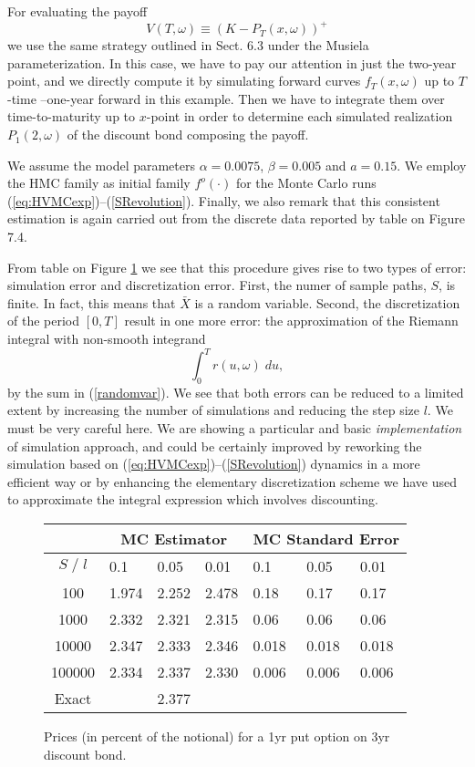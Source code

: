 For evaluating the payoff 
$$
V (T, \omega) \equiv (K - P_T(x, \omega))^+
$$
we use the same strategy outlined in Sect. 6.3 under the Musiela
parameterization. In this case, we have to pay our attention in just
the two-year point, and we directly compute it by simulating forward
curves $f_T(x,\omega)$ up to $T$-time --one-year forward in this
example. Then we have to integrate them over time-to-maturity up to
$x$-point in order to determine each simulated realization $P_1(2,
\omega)$ of the discount bond composing the payoff.  

We assume the model parameters $\alpha = 0.0075$, $\beta = 0.005$ and
$a = 0.15$. We employ the HMC family as initial family $f^o(\cdot)$
for the Monte Carlo runs
(\ref{eq:HVMCexp})--(\ref{SRevolution}). Finally, we also remark that
this consistent estimation is again carried out from the discrete data
reported by table on Figure 7.4. 

From table on Figure \ref{MCPut} we see that this procedure gives rise
to two types of error: simulation error and discretization
error. First, the numer of sample paths, $S$, is finite. In fact, this means
that $\bar{X}$ is a random variable. Second, the discretization of the
period $[0, T]$ result in one more error: the approximation of the
Riemann integral with non-smooth integrand 
$$
\int_0^T r(u,\omega) \; du,
$$
by the sum in (\ref{randomvar}). We see that both errors can be
reduced to a limited extent by increasing the number of simulations
and reducing the step size $l$. We must be very careful here. We are
showing a particular and basic {\sl implementation} of simulation
approach, and could be certainly improved by reworking the simulation
based on (\ref{eq:HVMCexp})--(\ref{SRevolution}) dynamics in a more
efficient way or by enhancing the elementary discretization scheme we
have used to approximate the integral expression which involves
discounting. 
\begin{figure}[h!]
\caption{Prices (in percent of the notional) for a 1yr put option on
  3yr discount bond.\label{MCPut}} 
\begin{center}
\begin{tabular}{|c|lll|lll|}
\hline\hline
& \multicolumn{3}{|c|}{MC Estimator} &
\multicolumn{3}{|c|}{MC Standard Error} \\
\hline
$S\; /\; l$ & 0.1 & 0.05 & 0.01 & 0.1 & 0.05 & 0.01 \\
\hline 
  100 & 1.974&    2.252&    2.478&    0.18&    0.17&    0.17\\
 1000 & 2.332&    2.321&    2.315&    0.06&    0.06&    0.06\\
10000 & 2.347&    2.333&    2.346&    0.018&   0.018&  0.018\\
100000& 2.334&    2.337&    2.330&    0.006&   0.006&  0.006\\
\hline
Exact & \multicolumn{3}{|c|}{2.377} & \multicolumn{3}{|c|}{} \\
\hline 
\end{tabular}
\end{center}
\end{figure}
\newpage\mbox{}\thispagestyle{empty}

